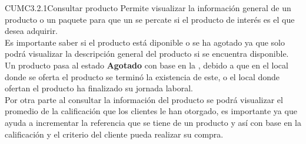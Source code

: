 
\begin{UseCase}{CUMC3.2.1}{Consultar producto}{
Permite visualizar la información general de un producto o un paquete para que un  se percate si el producto de interés es el que desea adquirir. \\  
Es importante saber si el producto está diponible o se ha agotado ya que solo podrá visualizar la descripción general del producto si se encuentra disponible. \\ Un producto pasa al estado \textbf{Agotado} con base en la  , debido a que en el local donde se oferta el producto se terminó la existencia de este, o el local donde ofertan el producto ha finalizado su jornada laboral. \\
Por otra parte al consultar la información del producto se podrá visualizar el promedio de la calificación que los clientes le han otorgado, es importante ya que ayuda a incrementar la referencia que se tiene de un producto y así con base en la calificación y el criterio del cliente pueda realizar su compra.\\
}
	\end{UseCase}
	
